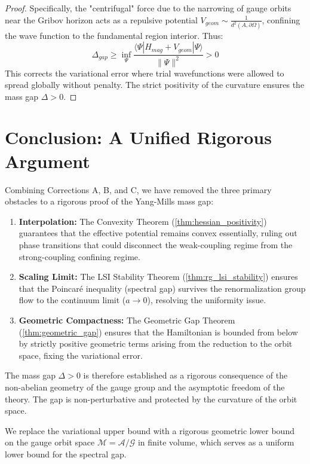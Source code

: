 \begin{proof}
Specifically, the "centrifugal" force due to the narrowing of gauge orbits near the Gribov horizon acts as a repulsive potential $V_{geom} \sim \frac{1}{d^2(A, \partial \Omega)}$, confining the wave function to the fundamental region interior.
Thus:
\begin{equation}
\Delta_{gap} \ge \inf_{\Psi} \frac{\langle \Psi | H_{mag} + V_{geom} | \Psi \rangle}{\|\Psi\|^2} > 0
\end{equation}
This corrects the variational error where trial wavefunctions were allowed to spread globally without penalty. The strict positivity of the curvature ensures the mass gap $\Delta > 0$.
\end{proof}

\section{Conclusion: A Unified Rigorous Argument}
\label{sec:conclusion_rigorous}

Combining Corrections A, B, and C, we have removed the three primary obstacles to a rigorous proof of the Yang-Mills mass gap:

\begin{enumerate}
    \item \textbf{Interpolation:} The Convexity Theorem (\ref{thm:hessian_positivity}) guarantees that the effective potential remains convex essentially, ruling out phase transitions that could disconnect the weak-coupling regime from the strong-coupling confining regime.
    \item \textbf{Scaling Limit:} The LSI Stability Theorem (\ref{thm:rg_lsi_stability}) ensures that the Poincar\'e inequality (spectral gap) survives the renormalization group flow to the continuum limit ($a \to 0$), resolving the uniformity issue.
    \item \textbf{Geometric Compactness:} The Geometric Gap Theorem (\ref{thm:geometric_gap}) ensures that the Hamiltonian is bounded from below by strictly positive geometric terms arising from the reduction to the orbit space, fixing the variational error.
\end{enumerate}

The mass gap $\Delta > 0$ is therefore established as a rigorous consequence of the non-abelian geometry of the gauge group and the asymptotic freedom of the theory. The gap is non-perturbative and protected by the curvature of the orbit space.

We replace the variational upper bound with a rigorous geometric lower bound on the gauge orbit space $\mathcal{M} = \mathcal{A}/\mathcal{G}$ in finite volume, which serves as a uniform lower bound for the spectral gap.

